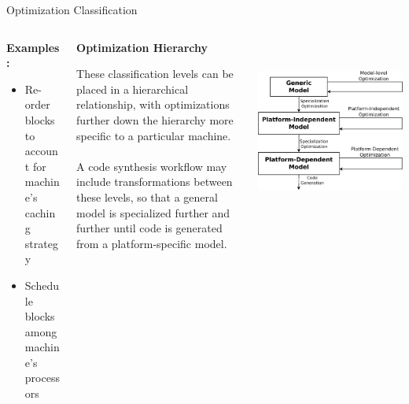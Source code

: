 \documentclass[final,hyperref={pdfpagelabels=false}]{beamer}
\begin{document}
\begin{frame}{}
\begin{block}{Optimization Classification}
\begin{columns}[t,totalwidth=\linewidth]
\begin{column}{.17\linewidth}
           \textbf{Examples:}
           
           \begin{itemize}
           \footnotesize
           \item Re-order blocks to account for machine's caching strategy
           \item Schedule blocks among machine's processors
           \end{itemize}
            \end{column}
            \hspace{-1.2cm}\vrule\hspace{.05cm}
            \begin{column}{.18\linewidth}
            \small
          \begin{center}\textbf{Optimization Hierarchy}\end{center}
          \footnotesize
            These classification levels can be placed in a hierarchical relationship, with optimizations
            further down the hierarchy more specific to a particular machine. \\~\\A code synthesis workflow may include transformations between these levels, so that a general model is specialized further and further until code is generated from a platform-specific model.
            \end{column}
            
            \begin{column}{.20\linewidth}
          ~\\~\\
            \includegraphics[width=\textwidth]{images/hierarchy}
            \end{column}
                        

\end{columns}
\end{block}
\end{frame}
\end{document}
